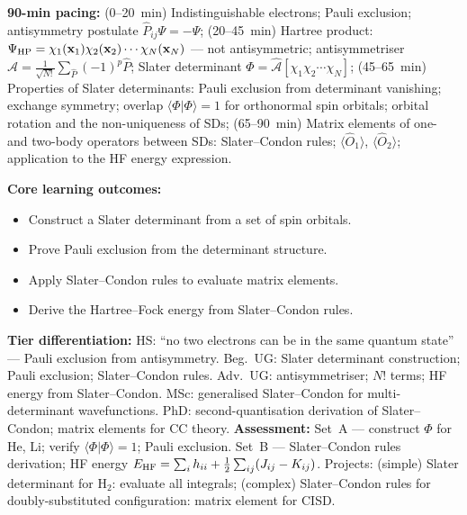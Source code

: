 \documentclass[11pt,a4paper]{article}
\begin{document}
\begin{tcolorbox}[chembox, title={Module~III.2 / L05: Antisymmetry, Hartree Products, and Slater Determinants}]
\textbf{90-min pacing:} (0--20~min) Indistinguishable electrons; Pauli exclusion; antisymmetry postulate $\hat{P}_{ij}\Psi=-\Psi$; (20--45~min) Hartree product: $\Psi_{\rm HP}=\chi_1(\mathbf{x}_1)\chi_2(\mathbf{x}_2)\cdots\chi_N(\mathbf{x}_N)$ --- not antisymmetric; antisymmetriser $\hat{\mathcal{A}}=\tfrac{1}{\sqrt{N!}}\sum_{\hat{P}}(-1)^p\hat{P}$; Slater determinant $\Phi=\hat{\mathcal{A}}[\chi_1\chi_2\cdots\chi_N]$; (45--65~min) Properties of Slater determinants: Pauli exclusion from determinant vanishing; exchange symmetry; overlap $\langle\Phi|\Phi\rangle=1$ for orthonormal spin orbitals; orbital rotation and the non-uniqueness of SDs; (65--90~min) Matrix elements of one- and two-body operators between SDs: Slater--Condon rules; $\langle\hat{O}_1\rangle$, $\langle\hat{O}_2\rangle$; application to the HF energy expression.

\medskip\textbf{Core learning outcomes:}
\begin{itemize}[leftmargin=1.4em,topsep=2pt,itemsep=1pt]
  \item Construct a Slater determinant from a set of spin orbitals.
  \item Prove Pauli exclusion from the determinant structure.
  \item Apply Slater--Condon rules to evaluate matrix elements.
  \item Derive the Hartree--Fock energy from Slater--Condon rules.
\end{itemize}
\medskip\textbf{Tier differentiation:}
HS: ``no two electrons can be in the same quantum state'' --- Pauli exclusion from antisymmetry.
Beg.\ UG: Slater determinant construction; Pauli exclusion; Slater--Condon rules.
Adv.\ UG: antisymmetriser; $N!$ terms; HF energy from Slater--Condon.
MSc: generalised Slater--Condon for multi-determinant wavefunctions.
PhD: second-quantisation derivation of Slater--Condon; matrix elements for CC theory.
\medskip\textbf{Assessment:}
Set~A --- construct $\Phi$ for He, Li; verify $\langle\Phi|\Phi\rangle=1$; Pauli exclusion.
Set~B --- Slater--Condon rules derivation; HF energy $E_{\rm HF}=\sum_i h_{ii}+\tfrac{1}{2}\sum_{ij}(J_{ij}-K_{ij})$.
Projects: (simple) Slater determinant for H$_2$: evaluate all integrals; (complex) Slater--Condon rules for doubly-substituted configuration: matrix element for CISD.
\end{tcolorbox}

\medskip
\end{document}
